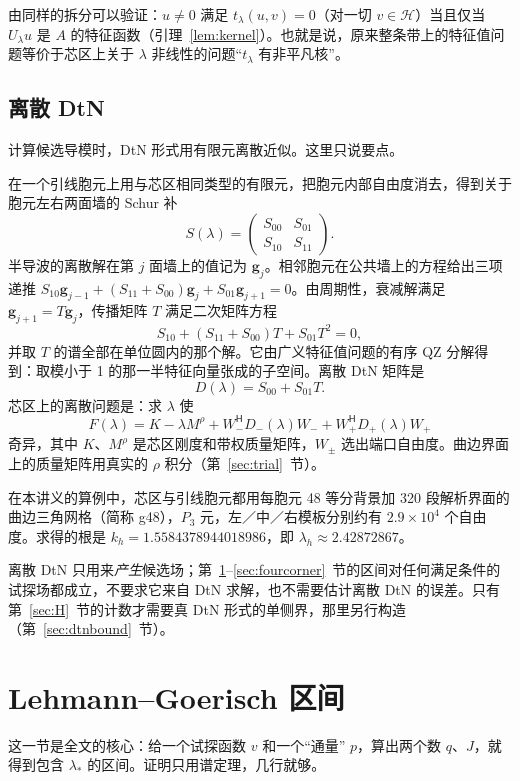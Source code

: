 \documentclass[11pt,a4paper,fontset=fandol]{ctexart}
\begin{document}
由同样的拆分可以验证：$u\ne0$ 满足 $t_\lambda(u,v)=0$（对一切 $v\in\mathcal H$）当且仅当 $U_\lambda u$ 是 $A$ 的特征函数（引理~\ref{lem:kernel}）。也就是说，原来整条带上的特征值问题等价于芯区上关于 $\lambda$ 非线性的问题“$t_\lambda$ 有非平凡核”。

\subsection{离散 DtN}
\label{sec:discrete-dtn}

计算候选导模时，DtN 形式用有限元离散近似。这里只说要点。

在一个引线胞元上用与芯区相同类型的有限元，把胞元内部自由度消去，得到关于胞元左右两面墙的 Schur 补
\[
S(\lambda)=\begin{pmatrix}S_{00}&S_{01}\\ S_{10}&S_{11}\end{pmatrix}.
\]
半导波的离散解在第 $j$ 面墙上的值记为 $\bm g_j$。相邻胞元在公共墙上的方程给出三项递推 $S_{10}\bm g_{j-1}+(S_{11}+S_{00})\bm g_j+S_{01}\bm g_{j+1}=0$。由周期性，衰减解满足 $\bm g_{j+1}=T\bm g_j$，传播矩阵 $T$ 满足二次矩阵方程
\[
S_{10}+(S_{11}+S_{00})T+S_{01}T^2=0 ,
\]
并取 $T$ 的谱全部在单位圆内的那个解。它由广义特征值问题的有序 QZ 分解得到：取模小于 1 的那一半特征向量张成的子空间。离散 DtN 矩阵是
\[
D(\lambda)=S_{00}+S_{01}T .
\]
芯区上的离散问题是：求 $\lambda$ 使
\[
F(\lambda)=K-\lambda M^\rho+W_-^{\mathsf H}D_-(\lambda)W_-+W_+^{\mathsf H}D_+(\lambda)W_+
\]
奇异，其中 $K$、$M^\rho$ 是芯区刚度和带权质量矩阵，$W_\pm$ 选出端口自由度。曲边界面上的质量矩阵用真实的 $\rho$ 积分（第~\ref{sec:trial}~节）。

在本讲义的算例中，芯区与引线胞元都用每胞元 48 等分背景加 320 段解析界面的曲边三角网格（简称 g48），$P_3$ 元，左／中／右模板分别约有 $2.9\times10^4$ 个自由度。求得的根是 $k_h=1.5584378944018986$，即 $\lambda_h\approx2.42872867$。

\begin{remark}
离散 DtN 只用来\emph{产生}候选场；第~\ref{sec:goerisch}--\ref{sec:fourcorner}~节的区间对任何满足条件的试探场都成立，不要求它来自 DtN 求解，也不需要估计离散 DtN 的误差。只有第~\ref{sec:H}~节的计数才需要真 DtN 形式的单侧界，那里另行构造（第~\ref{sec:dtnbound}~节）。
\end{remark}

\section{Lehmann--Goerisch 区间}
\label{sec:goerisch}
这一节是全文的核心：给一个试探函数 $v$ 和一个“通量” $p$，算出两个数 $q$、$J$，就得到包含 $\lambda_*$ 的区间。证明只用谱定理，几行就够。
\end{document}
